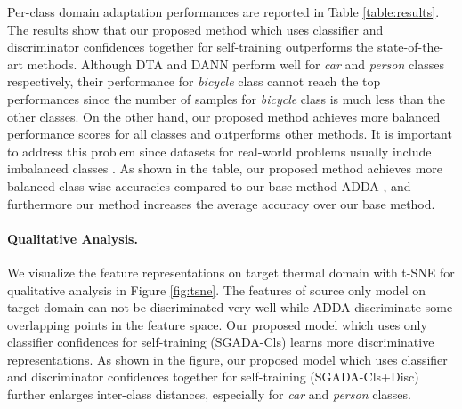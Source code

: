 \documentclass[final]{cvpr}
\begin{document}
Per-class domain adaptation performances are reported in Table \ref{table:results}. The results show that our proposed method which uses classifier and discriminator confidences together for self-training outperforms the state-of-the-art methods. Although DTA \cite{dta} and DANN \cite{dann} perform well for \textit{car} and \textit{person} classes respectively, their performance  for \textit{bicycle} class cannot reach the top performances since the number of samples for \textit{bicycle} class is much less than the other classes. On the other hand, our proposed method achieves more balanced performance scores for all classes and outperforms other methods. It is important to address this problem since datasets for real-world problems usually include imbalanced classes \cite{buda2018systematic, classimbalance}. As shown in the table, our proposed method achieves more balanced class-wise accuracies compared to our base method ADDA \cite{adda}, and furthermore our method increases the average accuracy over our base method.
\vspace{-2mm}

\paragraph{Qualitative Analysis.} We visualize the feature representations on target thermal domain with t-SNE \cite{tsne} for qualitative analysis in Figure \ref{fig:tsne}. The features of source only model on target domain can not be discriminated very well while ADDA \cite{adda} discriminate some overlapping points in the feature space. Our proposed model which uses only classifier confidences for self-training (SGADA-Cls) learns more discriminative representations. As shown in the figure, our proposed model which uses classifier and discriminator confidences together for self-training (SGADA-Cls+Disc) further enlarges inter-class distances, especially for \textit{car} and \textit{person} classes.
\vspace{-2mm}
\end{document}
